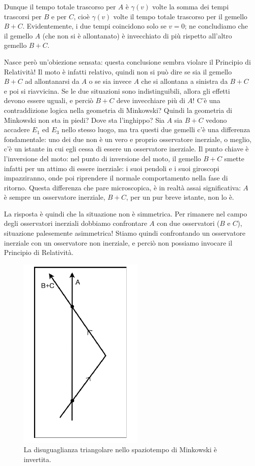 Dunque il tempo totale trascorso per $A$ è $\gamma(v)$ volte la somma dei tempi
trascorsi per $B$ e per $C$, cioè $\gamma(v)$ volte il tempo totale trascorso per il
gemello $B + C$. Evidentemente, i due tempi coincidono solo se $v = 0$; ne
concludiamo che il gemello $A$ (che non si è allontanato) è invecchiato di più
rispetto all'altro gemello $B + C$.

Nasce però un'obiezione sensata: questa conclusione sembra violare il Principio di Relatività!
Il moto è infatti relativo, quindi non si può dire se sia
il gemello $B + C$ ad allontanarsi da $A$ o se sia invece $A$ che si allontana a
sinistra da $B + C$ e poi si riavvicina. Se le due situazioni sono indistinguibili,
allora gli effetti devono essere uguali, e perciò $B + C$ deve invecchiare più di
$A$! C'è una contraddizione logica nella geometria di Minkowski? Quindi la
geometria di Minkowski non sta in piedi? Dove sta l'inghippo?
Sia $A$ sia $B + C$ vedono accadere $E_1$ ed $E_3$ nello stesso luogo, ma tra
questi due gemelli c'è una differenza fondamentale: uno dei due non è un
vero e proprio osservatore inerziale, o meglio, c'è un istante in cui egli cessa
di essere un osservatore inerziale. Il punto chiave è l'inversione del moto:
nel punto di inversione del moto, il gemello $B + C$ smette infatti per un
attimo di essere inerziale: i suoi pendoli e i suoi giroscopi impazziranno,
onde poi riprendere il normale comportamento nella fase di ritorno. Questa
differenza che pare microscopica, è in realtà assai significativa: $A$ è sempre
un osservatore inerziale, $B + C$, per un pur breve istante, non lo è.

La risposta è quindi che la situazione non è simmetrica. Per rimanere nel
campo degli osservatori inerziali dobbiamo confrontare $A$ con due osservatori
($B$ e $C$), situazione palesemente asimmetrica! 
Stiamo quindi confrontando un osservatore inerziale con un osservatore
non inerziale, e perciò non possiamo invocare il Principio di Relatività.

\begin{figure}[htbp]
   \centering
   \includegraphics[scale=1]{immagini/conferme_relspec/dis_triang_mink.png}
   \caption{\label{dis_triang_mink}La disuguaglianza triangolare nello spaziotempo di Minkowski è invertita.}
\end{figure}

